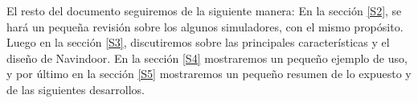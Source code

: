 
El resto del documento seguiremos de la siguiente manera: En la sección \ref{S2}, se hará un pequeña revisión sobre los algunos simuladores, con el mismo propósito. Luego en la  sección \ref{S3}, discutiremos sobre las principales características y el diseño de Navindoor. En la sección \ref{S4} mostraremos un pequeño ejemplo de uso, y por último en la sección \ref{S5} mostraremos un pequeño resumen de lo expuesto y de las siguientes desarrollos.







